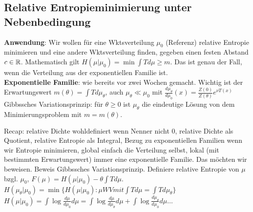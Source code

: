 \begin{outline}
\subsection{Relative Entropieminimierung unter Nebenbedingung}
\0 \textbf{Anwendung}: Wir wollen für eine Wktsverteilung $\mu_0$ (Referenz) relative Entropie minimieren und eine andere Wktsverteilung finden, gegeben einen festen Abstand $c\in \mathbb{R}$. Mathematisch gilt $H(\mu |\mu_0)=\min \int Td\mu \geq m$. Das ist genau der Fall, wenn die Verteilung aus der exponentiellen Familie ist.\\

\0 \textbf{Exponentielle Familie}: wie bereits vor zwei Wochen gemacht. Wichtig ist der Erwartungswert $m(\theta)=\int T d\mu_\theta$, auch $\mu_\theta \ll \mu_0$ mit $\frac{d\mu_\theta}{d\mu_0}(x)=\frac{Z(0)}{Z(\theta)}e^{\nu T(x)}$
\1 Gibbssches Variationsprinzip: für $\theta\geq 0$ ist $\mu_\theta$ die eindeutige Lösung von dem Minimierungsproblem mit $m=m(\theta)$. 
\end{outline}

\begin{outline}
\0 Recap: relative Dichte wohldefiniert wenn Nenner nicht 0, relative Dichte als Quotient, relative Entropie als Integral, Bezug zu exponentiellen Familien wenn wir Entropie minimieren, global einfach die Verteilung selbst, lokal (mit bestimmten Erwartungswert) immer eine exponentielle Familie. Das möchten wir beweisen.
    \1 Beweis Gibbssches Variationsprinzip. 
        \2 Definiere relative Entropie von $\mu$ bzgl. $\mu_0$, $F(\mu)=H(\mu|\mu_0)-\theta\int T d\mu$.  
        \2 $H(\mu_\theta | \mu_0)=\min \{H(\mu|\mu_0): \mu WV mit \int T d\mu = \int Td\mu_\theta\}$
        \2 $H(\mu|\mu_0)=\int \log\frac{d\mu}{d\mu_0}d\mu=\int \log \frac{d\mu}{d\mu_\theta}d\mu + \int \log \frac{d\mu_\theta}{d\mu_0}d\mu\ldots$
\end{outline}

